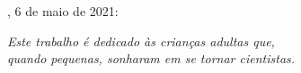 
%
% 
%
\begin{folhadeaprovacao}

  \begin{center}
    {\ABNTEXchapterfont\large\MakeUppercase{\imprimirautor}}

    \vspace*{\fill}\vspace*{\fill}
    \begin{center}
      \ABNTEXchapterfont\bfseries\Large\MakeUppercase{\imprimirtitulo}
    \end{center}
    \vspace*{\fill}
    
    \imprimirtextoaprovacao
     
    \vspace*{1cm}
    
	\imprimirlocal, 6 de maio de 2021:

    \vspace*{\fill}

   \end{center}
        


      
    \vspace*{1cm}  
  
\end{folhadeaprovacao}

\begin{dedicatoria}
   \vspace*{\fill}
   \begin{flushright}
   \noindent
   \textit{ Este trabalho é dedicado às crianças adultas que,\\
   quando pequenas, sonharam em se tornar cientistas.}\vspace*{2cm}
   \end{flushright}
\end{dedicatoria}


